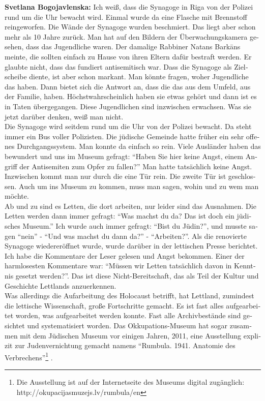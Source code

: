 \begin{otherlanguage}{ngerman}
\textbf{Svetlana Bogojavlenska:} Ich weiß, dass die Synagoge in Riga von der Polizei rund um die Uhr bewacht wird. Einmal wurde da eine Flasche mit Brennstoff reingeworfen. Die Wände der Synagoge wurden beschmiert. Das liegt aber schon mehr als 10 Jahre zurück. Man hat auf den Bildern der Überwachungskamera gesehen, dass das Jugendliche waren. Der damalige Rabbiner Natans Barkāns meinte, die sollten einfach zu Hause von ihren Eltern dafür bestraft werden. Er glaubte nicht, dass das fundiert antisemitisch war. Dass die Synagoge als Zielscheibe diente, ist aber schon markant. Man könnte fragen, woher Jugendliche das haben. Dann bietet sich die Antwort an, dass die das aus dem Umfeld, aus der Familie, haben. Höchstwahrscheinlich haben sie etwas gehört und dann ist es in Taten übergegangen. Diese Jugendlichen sind inzwischen erwachsen. Was sie jetzt darüber denken, weiß man nicht.\\ 
Die Synagoge wird seitdem rund um die Uhr von der Polizei bewacht. Da steht immer ein Bus voller Polizisten. Die jüdische Gemeinde hatte früher ein sehr offenes Durchgangssystem. Man konnte da einfach so rein. Viele Ausländer haben das bewundert und uns im Museum gefragt: "`Haben Sie hier keine Angst, einem Angriff der Antisemiten zum Opfer zu fallen?"' Man hatte tatsächlich keine Angst. Inzwischen kommt man nur durch die eine Tür rein. Die zweite Tür ist geschlossen. Auch um ins Museum zu kommen, muss man sagen, wohin und zu wem man möchte.\\
Ab und zu sind es Letten, die dort arbeiten, nur leider sind das Ausnahmen. Die Letten werden dann immer gefragt: "`Was machst du da? Das ist doch ein jüdisches Museum."' Ich wurde auch immer gefragt: "`Bist du Jüdin?"', und musste sagen "`nein"' - "`Und was machst du dann da?"' - "`Arbeiten?"'. Als die renovierte Synagoge wiedereröffnet wurde, wurde darüber in der lettischen Presse berichtet. Ich habe die Kommentare der Leser gelesen und Angst bekommen. Einer der harmlosesten Kommentare war: "`Müssen wir Letten tatsächlich davon in Kenntnis gesetzt werden?"'. Das ist diese Nicht-Bereitschaft, das als Teil der Kultur und Geschichte Lettlands anzuerkennen.\\
Was allerdings die Aufarbeitung des Holocaust betrifft, hat Lettland, zumindest die lettische Wissenschaft, große Fortschritte gemacht. Es ist fast alles aufgearbeitet worden, was aufgearbeitet werden konnte. Fast alle Archivbestände sind gesichtet und systematisiert worden. Das Okkupations-Museum hat sogar zusammen mit dem Jüdischen Museum vor einigen Jahren, 2011, eine Ausstellung explizit zur Judenvernichtung gemacht namens "`Rumbula. 1941. Anatomie des Verbrechens"'\footnote{Die Ausstellung ist auf der Internetseite des Museums digital zugänglich: http://okupacijasmuzejs.lv/rumbula/en} .


\end{otherlanguage}
